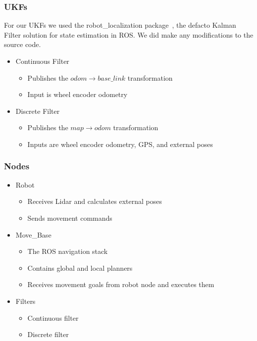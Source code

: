 \documentclass[14pt]{beamer}
\begin{document}
\begin{frame}
\frametitle{UKFs}
For our UKFs we used the robot\_localization package~\cite{MooreStouch2014, Moore}, the defacto Kalman Filter solution for state estimation in ROS. We did make any modifications to the source code.
\pause
\begin{itemize}
\item Continuous Filter
    \begin{itemize}
    \item Publishes the $odom \rightarrow base\_link$ transformation
    \item Input is wheel encoder odometry
    \end{itemize}
\pause
\item Discrete Filter
    \begin{itemize}
    \item Publishes the $map \rightarrow odom$ transformation
    \item Inputs are wheel encoder odometry, GPS, and external poses
    \end{itemize}
\end{itemize}
\end{frame}

\begin{frame}
\frametitle{Nodes}
\begin{itemize}
\item Robot
    \begin{itemize}
    \item Receives Lidar and calculates external poses
    \item Sends movement commands
    \end{itemize}
\item Move\_Base
    \begin{itemize}
    \item The ROS navigation stack
    \item Contains global and local planners
    \item Receives movement goals from robot node and executes them
    \end{itemize}
\item Filters
    \begin{itemize}
    \item Continuous filter
    \item Discrete filter
    \end{itemize}
\end{itemize}
\end{frame}
\end{document}
